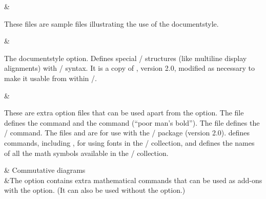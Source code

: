 \begin{filelist}
\newline {}\newline {}\newline
{}\newline {}\newline {}&

These files are sample files illustrating the use of the 
documentstyle.\sloppy
\end{filelist}

\begin{filelist}
&

The  documentstyle option. Defines
special \amstex/ structures (like multiline display alignments) with
\latex/ syntax.  It is a copy of , version 2.0,
modified as necessary to make it usable from within \latex/.
\end{filelist}

\begin{filelist}
\newline {}\newline
{}\newline {}&

These are extra option files that can be used apart from the
 option.
The file  defines the  command
and the  command (``poor man's
bold'').  The file
 defines the \amstex/  command.
The files  and  are for
use with the \amsfonts/ package (version 2.0).   
defines commands, including ,
for using fonts in the \amsfonts/ collection,
and  defines the names of
all the math symbols available in the \amsfonts/
collection.\sloppy
\end{filelist}

\begin{filelist}
& Commutative diagrams\\

&The   option
contains extra mathematical commands that can be used as add-ons with the
 option. (It can also be used without the
 option.)
\end{filelist}

